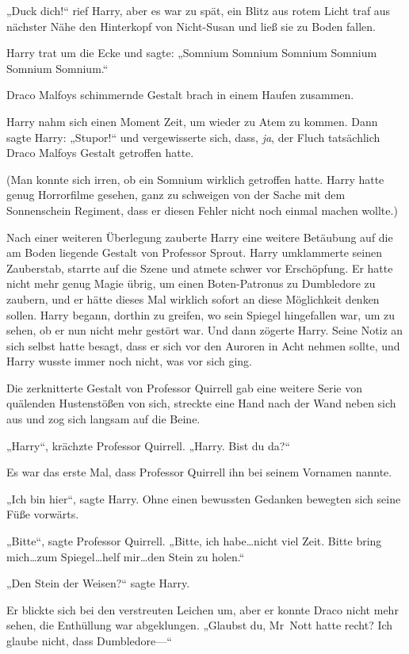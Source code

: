 {„Duck dich!“ rief Harry, aber es war zu spät, ein Blitz aus rotem Licht traf aus nächster Nähe den Hinterkopf von Nicht-Susan und ließ sie zu Boden fallen.

Harry trat um die Ecke und sagte: „Somnium Somnium Somnium Somnium Somnium Somnium.“

Draco Malfoys schimmernde Gestalt brach in einem Haufen zusammen.

Harry nahm sich einen Moment Zeit, um wieder zu Atem zu kommen. Dann sagte Harry: „Stupor!“ und vergewisserte sich, dass, \emph{ja}, der Fluch tatsächlich Draco Malfoys Gestalt getroffen hatte.

(Man konnte sich irren, ob ein Somnium wirklich getroffen hatte. Harry hatte genug Horrorfilme gesehen, ganz zu schweigen von der Sache mit dem Sonnenschein Regiment, dass er diesen Fehler nicht noch einmal machen wollte.)

Nach einer weiteren Überlegung zauberte Harry eine weitere Betäubung auf die am Boden liegende Gestalt von Professor Sprout. Harry umklammerte seinen Zauberstab, starrte auf die Szene und atmete schwer vor Erschöpfung. Er hatte nicht mehr genug Magie übrig, um einen Boten-Patronus zu Dumbledore zu zaubern, und er hätte dieses Mal wirklich sofort an diese Möglichkeit denken sollen. Harry begann, dorthin zu greifen, wo sein Spiegel hingefallen war, um zu sehen, ob er nun nicht mehr gestört war. Und dann zögerte Harry. Seine Notiz an sich selbst hatte besagt, dass er sich vor den Auroren in Acht nehmen sollte, und Harry wusste immer noch nicht, was vor sich ging.

Die zerknitterte Gestalt von Professor Quirrell gab eine weitere Serie von quälenden Hustenstößen von sich, streckte eine Hand nach der Wand neben sich aus und zog sich langsam auf die Beine.

„Harry“, krächzte Professor Quirrell. „Harry. Bist du da?“

Es war das erste Mal, dass Professor Quirrell ihn bei seinem Vornamen nannte.

„Ich bin hier“, sagte Harry. Ohne einen bewussten Gedanken bewegten sich seine Füße vorwärts.

„Bitte“, sagte Professor Quirrell. „Bitte, ich habe…nicht viel Zeit. Bitte bring mich…zum Spiegel…helf mir…den Stein zu holen.“

„Den Stein der Weisen?“ sagte Harry.

Er blickte sich bei den verstreuten Leichen um, aber er konnte Draco nicht mehr sehen, die Enthüllung war abgeklungen. „Glaubst du, Mr~Nott hatte recht? Ich glaube nicht, dass Dumbledore—“

}
